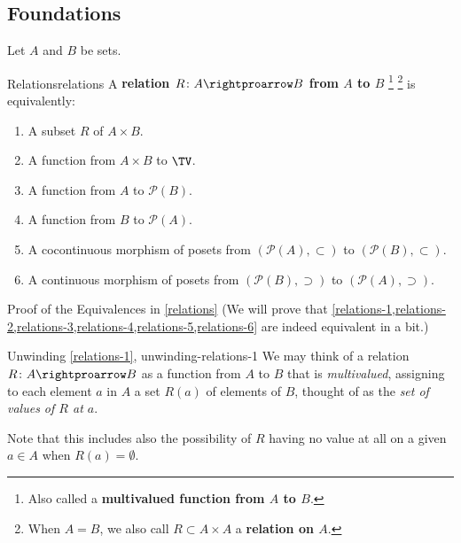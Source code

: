 \subsection{Foundations}\label{subsection-relations-foundations}
Let $A$ and $B$ be sets.
\begin{definition}{Relations}{relations}%
    A \textbf{relation $R\colon A\rightproarrow B$ from $A$ to $B$}%
    \footnote{%
        Also called a \textbf{multivalued function from $A$ to $B$}.
    }%
    \footnote{%
        When $A=B$, we also call $R\subset A\times A$ a \textbf{relation on $A$}.
        \par\vspace*{\TCBBoxCorrection}
    } %
    is equivalently:
    \begin{enumerate}
        \item\label{relations-1}A subset $R$ of $A\times B$.%
        \item\label{relations-2}A function from $A\times B$                                       to $\TV$.
        \item\label{relations-3}A function from $A$                                               to $\mathcal{P}(B)$.
        \item\label{relations-4}A function from $B$                                               to $\mathcal{P}(A)$.
        \item\label{relations-5}A cocontinuous morphism of posets from $(\mathcal{P}(A),\subset)$ to $(\mathcal{P}(B),\subset)$.
        \item\label{relations-6}A continuous morphism of posets from $(\mathcal{P}(B),\supset)$ to $(\mathcal{P}(A),\supset)$.
    \end{enumerate}
\end{definition}
\begin{Proof}{Proof of the Equivalences in \cref{relations}}%
    (We will prove that \cref{relations-1,relations-2,relations-3,relations-4,relations-5,relations-6} are indeed equivalent in a bit.)
\end{Proof}
\begin{remark}{Unwinding \cref{relations-1}, \rmI}{unwinding-relations-1}%
    We may think of a relation $R\colon A\rightproarrow B$ as a function from $A$ to $B$ that is \emph{multivalued}, assigning to each element $a$ in $A$ a set $R(a)$ of elements of $B$, thought of as the \emph{set of values of $R$ at $a$}.

    \indent Note that this includes also the possibility of $R$ having no value at all on a given $a\in A$ when $R(a)=\emptyset$.
\end{remark}
